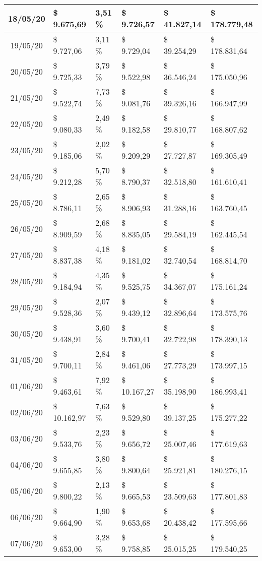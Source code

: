 \begin{small}
\begin{longtable}{|c|l|l|l|l|l|}
18/05/20 & \$ 9.675,69 & 3,51 \% & \$ 9.726,57 & \$ 41.827,14 & \$ 178.779,48 \\ \hline
19/05/20 & \$ 9.727,06 & 3,11 \% & \$ 9.729,04 & \$ 39.254,29 & \$ 178.831,64 \\ \hline
20/05/20 & \$ 9.725,33 & 3,79 \% & \$ 9.522,98 & \$ 36.546,24 & \$ 175.050,96 \\ \hline
21/05/20 & \$ 9.522,74 & 7,73 \% & \$ 9.081,76 & \$ 39.326,16 & \$ 166.947,99 \\ \hline
22/05/20 & \$ 9.080,33 & 2,49 \% & \$ 9.182,58 & \$ 29.810,77 & \$ 168.807,62 \\ \hline
23/05/20 & \$ 9.185,06 & 2,02 \% & \$ 9.209,29 & \$ 27.727,87 & \$ 169.305,49 \\ \hline
24/05/20 & \$ 9.212,28 & 5,70 \% & \$ 8.790,37 & \$ 32.518,80 & \$ 161.610,41 \\ \hline
25/05/20 & \$ 8.786,11 & 2,65 \% & \$ 8.906,93 & \$ 31.288,16 & \$ 163.760,45 \\ \hline
26/05/20 & \$ 8.909,59 & 2,68 \% & \$ 8.835,05 & \$ 29.584,19 & \$ 162.445,54 \\ \hline
27/05/20 & \$ 8.837,38 & 4,18 \% & \$ 9.181,02 & \$ 32.740,54 & \$ 168.814,70 \\ \hline
28/05/20 & \$ 9.184,94 & 4,35 \% & \$ 9.525,75 & \$ 34.367,07 & \$ 175.161,24 \\ \hline
29/05/20 & \$ 9.528,36 & 2,07 \% & \$ 9.439,12 & \$ 32.896,64 & \$ 173.575,76 \\ \hline
30/05/20 & \$ 9.438,91 & 3,60 \% & \$ 9.700,41 & \$ 32.722,98 & \$ 178.390,13 \\ \hline
31/05/20 & \$ 9.700,11 & 2,84 \% & \$ 9.461,06 & \$ 27.773,29 & \$ 173.997,15 \\ \hline
01/06/20 & \$ 9.463,61 & 7,92 \% & \$ 10.167,27 & \$ 35.198,90 & \$ 186.993,41 \\ \hline
02/06/20 & \$ 10.162,97 & 7,63 \% & \$ 9.529,80 & \$ 39.137,25 & \$ 175.277,22 \\ \hline
03/06/20 & \$ 9.533,76 & 2,23 \% & \$ 9.656,72 & \$ 25.007,46 & \$ 177.619,63 \\ \hline
04/06/20 & \$ 9.655,85 & 3,80 \% & \$ 9.800,64 & \$ 25.921,81 & \$ 180.276,15 \\ \hline
05/06/20 & \$ 9.800,22 & 2,13 \% & \$ 9.665,53 & \$ 23.509,63 & \$ 177.801,83 \\ \hline
06/06/20 & \$ 9.664,90 & 1,90 \% & \$ 9.653,68 & \$ 20.438,42 & \$ 177.595,66 \\ \hline
07/06/20 & \$ 9.653,00 & 3,28 \% & \$ 9.758,85 & \$ 25.015,25 & \$ 179.540,25 \\ \hline

\end{longtable}
\end{small}
